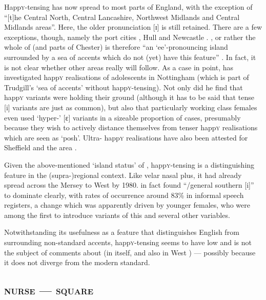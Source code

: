 Happ\textsc{y}-tensing has now spread to most parts of England, with the exception of ``[t]he Central North, Central Lancashire, Northwest Midlands and Central Midlands areas''.
Here, the older pronunciation [ɪ] is still retained.
There are a few exceptions, though, namely the port cities , Hull and Newcastle \citep[cf.][62]{trudgill1999}.
, or rather the whole of  (and parts of Chester) is therefore ``an `ee'-pronouncing island surrounded by a sea of accents which do not (yet) have this feature'' \citep[72]{trudgill1999}.
In fact, it is not clear whether other areas really will follow.
As a case in point, \textcite{flynn2010} has investigated happ\textsc{y} realisations of adolescents in Nottingham (which is part of Trudgill's `sea of accents' without happ\textsc{y}-tensing).
Not only did he find that  happ\textsc{y} variants were holding their ground (although it has to be said that tense [i] variants are just as common), but also that particularly working class females even used `hyper-' [ɛ] variants in a sizeable proportion of cases, presumably because they wish to actively distance themselves from tenser happ\textsc{y} realisations which are seen as `posh'.
Ultra- happ\textsc{y} realisations have also been attested for Sheffield \parencite{stoddartetal1999} and the  area \parencite{watts2006}.

Given the above-mentioned `island status' of , happ\textsc{y}-tensing is a distinguishing feature in the (supra-)regional context.
Like velar nasal plus, it had already spread across the Mersey to West  by 1980.
\textcite[97 and 99]{newbrook1999} in fact found ``/general southern [i]'' to dominate clearly, with rates of occurrence around 83\% in informal speech registers, a change which was apparently driven by younger females, who were among the first to introduce  variants of this and several other variables.

Notwithstanding its usefulness as a feature that distinguishes  English from surrounding non-standard accents, happ\textsc{y}-tensing seems to have low  and is not the subject of comments about  (in  itself, and also in West ) --- possibly because it does not diverge from the modern standard.

		\subsection{\textsc{nurse} --- \textsc{square}}\label{sec.var.vow.nurse}

